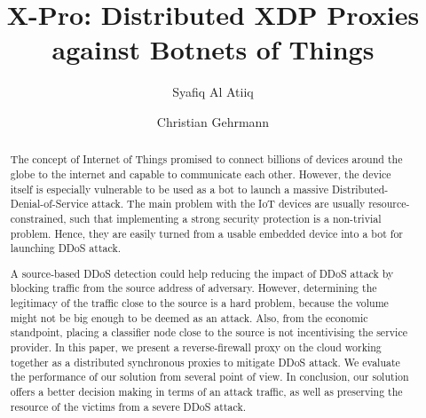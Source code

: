 \documentclass[sigplan,screen]{acmart}
\begin{document}
\title{X-Pro: Distributed XDP Proxies against Botnets of Things}

\author{Syafiq Al Atiiq}
\author{Christian Gehrmann}

\begin{abstract}
The concept of Internet of Things promised to connect billions of devices around the globe to the internet and capable to communicate each other. However, the device itself is especially vulnerable to be used as a bot to launch a massive Distributed-Denial-of-Service attack. The main problem with the IoT devices are usually resource-constrained, such that implementing a strong security protection is a non-trivial problem. Hence, they are easily turned from a usable embedded device into a bot for launching DDoS attack. 

A source-based DDoS detection could help reducing the impact of DDoS attack by blocking traffic from the source address of adversary. However, determining the legitimacy of the traffic close to the source is a hard problem, because the volume might not be big enough to be deemed as an attack. Also, from the economic standpoint, placing a classifier node close to the source is not incentivising the service provider. In this paper, we present a reverse-firewall proxy on the cloud working together as a distributed synchronous proxies to mitigate DDoS attack. We evaluate the performance of our solution from several point of view. In conclusion, our solution offers a better decision making in terms of an attack traffic, as well as preserving the resource of the victims from a severe DDoS attack.  
\end{abstract}

\end{document}
